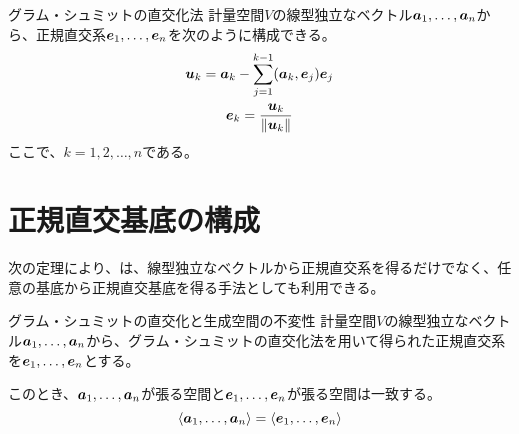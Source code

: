 \documentclass[../../../topic_linear-algebra]{subfiles}
\begin{document}
\begin{theorem}{グラム・シュミットの直交化法}
  計量空間$V$の線型独立なベクトル$\vb*{a}_1, \ldots, \vb*{a}_n$から、正規直交系$\vb*{e}_1, \ldots, \vb*{e}_n$を次のように構成できる。
  \begin{gather*}
    \vb*{u}_k = \vb*{a}_k - \sum_{j=1}^{k-1} (\vb*{a}_k, \vb*{e}_j) \vb*{e}_j \\
    \vb*{e}_k = \frac{\vb*{u}_k}{\|\vb*{u}_k\|}
  \end{gather*}
  ここで、$k = 1, 2, \ldots, n$である。
\end{theorem}

\sectionline
\section{正規直交基底の構成}

次の定理により、は、線型独立なベクトルから正規直交系を得るだけでなく、任意の基底から正規直交基底を得る手法としても利用できる。

\begin{theorem}{グラム・シュミットの直交化と生成空間の不変性}\label{thm:gram-schmidt-span-invariance}
  計量空間$V$の線型独立なベクトル$\vb*{a}_1, \ldots, \vb*{a}_n$から、グラム・シュミットの直交化法を用いて得られた正規直交系を$\vb*{e}_1, \ldots, \vb*{e}_n$とする。
  
  このとき、$\vb*{a}_1,\ldots,\vb*{a}_n$が張る空間と$\vb*{e}_1,\ldots,\vb*{e}_n$が張る空間は一致する。
  \begin{equation*}
    \langle \vb*{a}_1, \ldots, \vb*{a}_n \rangle = \langle \vb*{e}_1, \ldots, \vb*{e}_n \rangle
  \end{equation*}
\end{theorem}
\end{document}

